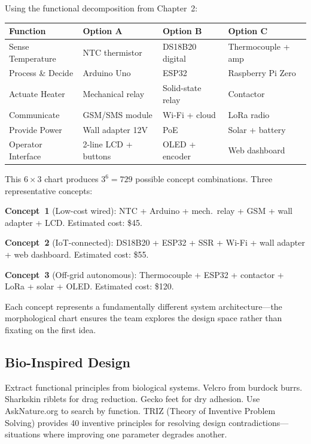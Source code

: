 \documentclass[11pt,letterpaper,twoside,openany]{book}
\begin{document}
\begin{keyconceptbox}
Using the functional decomposition from Chapter~2:

\begin{center}
\small
\begin{tabularx}{\textwidth}{l X X X}
\toprule
\textbf{Function} & \textbf{Option A} & \textbf{Option B} & \textbf{Option C} \\
\midrule
Sense Temperature & NTC thermistor & DS18B20 digital & Thermocouple + amp \\
Process \& Decide & Arduino Uno & ESP32 & Raspberry Pi Zero \\
Actuate Heater & Mechanical relay & Solid-state relay & Contactor \\
Communicate & GSM/SMS module & Wi-Fi + cloud & LoRa radio \\
Provide Power & Wall adapter 12V & PoE & Solar + battery \\
Operator Interface & 2-line LCD + buttons & OLED + encoder & Web dashboard \\
\bottomrule
\end{tabularx}
\end{center}

This $6 \times 3$ chart produces $3^6 = 729$ possible concept combinations. Three representative concepts:

\textbf{Concept~1} (Low-cost wired): NTC + Arduino + mech.\ relay + GSM + wall adapter + LCD. Estimated cost: \$45.

\textbf{Concept~2} (IoT-connected): DS18B20 + ESP32 + SSR + Wi-Fi + wall adapter + web dashboard. Estimated cost: \$55.

\textbf{Concept~3} (Off-grid autonomous): Thermocouple + ESP32 + contactor + LoRa + solar + OLED. Estimated cost: \$120.

Each concept represents a fundamentally different system architecture---the morphological chart ensures the team explores the design space rather than fixating on the first idea.
\end{keyconceptbox}

\subsection{Bio-Inspired Design}
Extract functional principles from biological systems. Velcro from burdock burrs. Sharkskin riblets for drag reduction. Gecko feet for dry adhesion. Use AskNature.org to search by function. TRIZ (Theory of Inventive Problem Solving) provides 40 inventive principles for resolving design contradictions---situations where improving one parameter degrades another.
\end{document}
